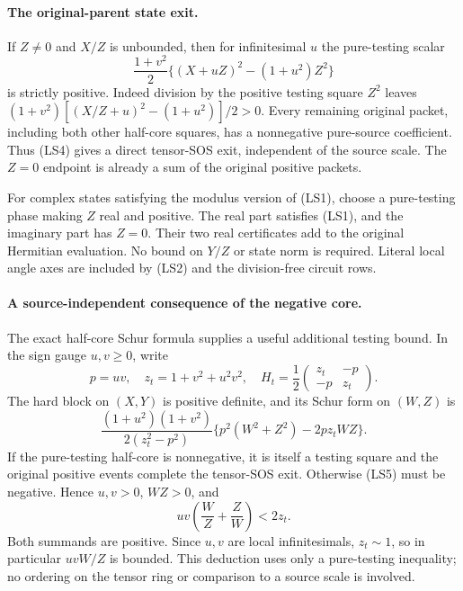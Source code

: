 \paragraph{The original-parent state exit.}
If $Z\ne0$ and $X/Z$ is unbounded, then for infinitesimal $u$
the pure-testing scalar
\[
 \frac{1+v^2}{2}
       \big\{(X+uZ)^2-(1+u^2)Z^2\big\}              \tag{LS4}
\]
is strictly positive. Indeed division by the positive testing square
$Z^2$ leaves $(1+v^2)[(X/Z+u)^2-(1+u^2)]/2>0$.
Every remaining original packet, including both other half-core
squares, has a nonnegative pure-source coefficient. Thus (LS4)
gives a direct tensor-SOS exit, independent of the source scale.
The $Z=0$ endpoint is already a sum of the original positive packets.

For complex states satisfying the modulus version of (LS1), choose
a pure-testing phase making $Z$ real and positive. The real part
satisfies (LS1), and the imaginary part has $Z=0$. Their two real
certificates add to the original Hermitian evaluation. No bound on
$Y/Z$ or state norm is required. Literal local angle axes are included
by (LS2) and the division-free circuit rows.

\paragraph{A source-independent consequence of the negative core.}
The exact half-core Schur formula supplies a useful additional
testing bound. In the sign gauge $u,v\ge0$, write
\[
 p=uv,\quad z_t=1+v^2+u^2v^2,\quad
 H_t=\frac12\begin{pmatrix}z_t&-p\\-p&z_t\end{pmatrix}.
\]
The hard block on $(X,Y)$ is positive definite, and its Schur form
on $(W,Z)$ is
\[
 \frac{(1+u^2)(1+v^2)}{2(z_t^2-p^2)}
          \{p^2(W^2+Z^2)-2pz_tWZ\}.                 \tag{LS5}
\]
If the pure-testing half-core is nonnegative, it is itself a testing
square and the original positive events complete the tensor-SOS exit.
Otherwise (LS5) must be negative. Hence $u,v>0$, $WZ>0$, and
\[
       uv\left(\frac WZ+\frac ZW\right)<2z_t.
\]
Both summands are positive. Since $u,v$ are local infinitesimals,
$z_t\sim1$, so in particular $uvW/Z$ is bounded. This deduction
uses only a pure-testing inequality; no ordering on the tensor ring
or comparison to a source scale is involved.

